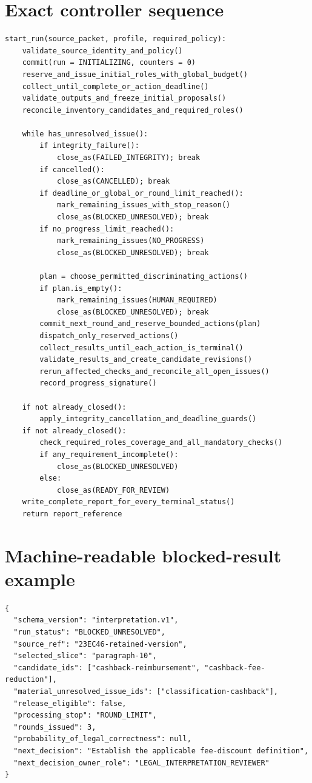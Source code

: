 \section{Exact controller sequence}
\label{sec:controller-reference}

\begin{lstlisting}[caption={Main controller, with explicit terminal uncertainty.}]
start_run(source_packet, profile, required_policy):
    validate_source_identity_and_policy()
    commit(run = INITIALIZING, counters = 0)
    reserve_and_issue_initial_roles_with_global_budget()
    collect_until_complete_or_action_deadline()
    validate_outputs_and_freeze_initial_proposals()
    reconcile_inventory_candidates_and_required_roles()

    while has_unresolved_issue():
        if integrity_failure():
            close_as(FAILED_INTEGRITY); break
        if cancelled():
            close_as(CANCELLED); break
        if deadline_or_global_or_round_limit_reached():
            mark_remaining_issues_with_stop_reason()
            close_as(BLOCKED_UNRESOLVED); break
        if no_progress_limit_reached():
            mark_remaining_issues(NO_PROGRESS)
            close_as(BLOCKED_UNRESOLVED); break

        plan = choose_permitted_discriminating_actions()
        if plan.is_empty():
            mark_remaining_issues(HUMAN_REQUIRED)
            close_as(BLOCKED_UNRESOLVED); break
        commit_next_round_and_reserve_bounded_actions(plan)
        dispatch_only_reserved_actions()
        collect_results_until_each_action_is_terminal()
        validate_results_and_create_candidate_revisions()
        rerun_affected_checks_and_reconcile_all_open_issues()
        record_progress_signature()

    if not already_closed():
        apply_integrity_cancellation_and_deadline_guards()
    if not already_closed():
        check_required_roles_coverage_and_all_mandatory_checks()
        if any_requirement_incomplete():
            close_as(BLOCKED_UNRESOLVED)
        else:
            close_as(READY_FOR_REVIEW)
    write_complete_report_for_every_terminal_status()
    return report_reference
\end{lstlisting}

\section{Machine-readable blocked-result example}

\begin{lstlisting}[caption={A blocked result preserves alternatives and the next decision.}]
{
  "schema_version": "interpretation.v1",
  "run_status": "BLOCKED_UNRESOLVED",
  "source_ref": "23EC46-retained-version",
  "selected_slice": "paragraph-10",
  "candidate_ids": ["cashback-reimbursement", "cashback-fee-reduction"],
  "material_unresolved_issue_ids": ["classification-cashback"],
  "release_eligible": false,
  "processing_stop": "ROUND_LIMIT",
  "rounds_issued": 3,
  "probability_of_legal_correctness": null,
  "next_decision": "Establish the applicable fee-discount definition",
  "next_decision_owner_role": "LEGAL_INTERPRETATION_REVIEWER"
}
\end{lstlisting}

